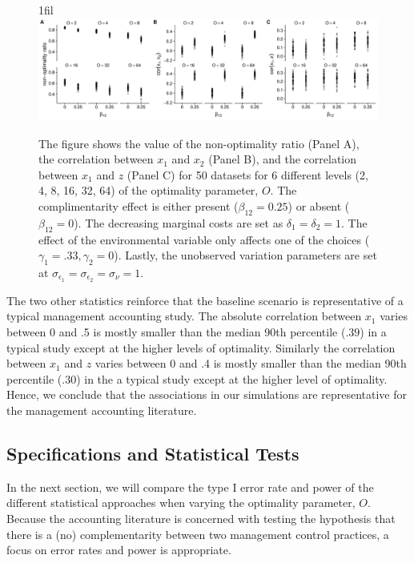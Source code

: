 \documentclass[12pt]{article}
\makeatletter
\newcommand*{\centerfloat}{%
  \parindent \z@
  \leftskip \z@ \@plus 1fil \@minus \textwidth
  \rightskip\leftskip
  \parfillskip \z@skip}
\makeatother
\begin{document}
\begin{figure}
\centerfloat
\includegraphics[width=450px]{figure-latex/sample_descriptives.pdf}
\caption[Calibration of Simulated Datasets]{\label{calibration} The figure shows the value of the non-optimality ratio (Panel A), the correlation between $x_1$ and $x_2$ (Panel B), and the correlation between $x_1$ and $z$ (Panel C) for 50 datasets for 6 different levels (2, 4, 8, 16, 32, 64) of the optimality parameter, $O$. The complimentarity effect is either present ($\beta_{12} = 0.25$) or absent ($\beta_{12} = 0$). The decreasing marginal costs are set as $\delta_1 = \delta_2 = 1$. The effect of the environmental variable only affects one of the choices
($\gamma_1 = .33, \gamma_2 = 0$). Lastly, the unobserved variation parameters are set at $\sigma_{\epsilon_1} = \sigma_{\epsilon_2} = \sigma_{\nu} = 1.$}
\end{figure}

The two other statistics reinforce that the baseline scenario is representative of a typical management accounting study. The absolute correlation between $x_1$ varies between 0 and .5 is mostly smaller than the median 90th percentile ($.39$) in a typical study except at the higher levels of optimality. Similarly the correlation between $x_1$ and $z$ varies between 0 and .4 is mostly smaller than the median 90th percentile (.30) in the a typical study except at the higher level of optimality. Hence, we conclude that the associations in our simulations are representative for the management accounting literature. 

\subsection{Specifications and Statistical Tests}
In the next section, we will compare the type I error rate and power of the different statistical approaches when varying the optimality parameter, \(O\). Because the accounting literature is concerned with testing the hypothesis that there is a (no) complementarity between two management control practices, a focus on error rates and power is appropriate. 
\end{document}
